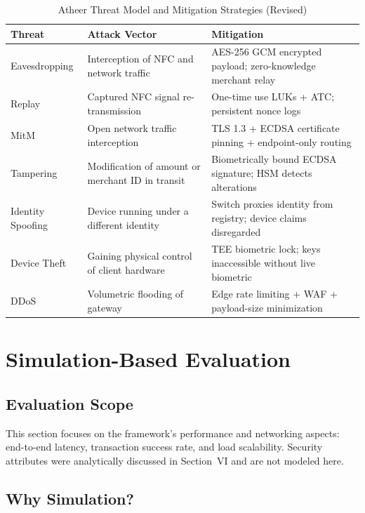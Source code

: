\documentclass[conference,10pt]{IEEEtran}
\begin{document}
\begin{table}[t]
\caption{Atheer Threat Model and Mitigation Strategies (Revised)}
\label{tab:threats}
\centering
\footnotesize
\begin{tabular}{@{}p{1.6cm}p{4.2cm}p{9cm}@{}}
\toprule
\textbf{Threat} & \textbf{Attack Vector} & \textbf{Mitigation} \\
\midrule
Eavesdropping & Interception of NFC and network traffic & AES-256 GCM encrypted payload; zero-knowledge merchant relay \\
Replay & Captured NFC signal re-transmission & One-time use LUKs + ATC; persistent nonce logs \\
MitM & Open network traffic interception & TLS 1.3 + ECDSA certificate pinning + endpoint-only routing \\
Tampering & Modification of amount or merchant ID in transit & Biometrically bound ECDSA signature; HSM detects alterations \\
Identity Spoofing & Device running under a different identity & Switch proxies identity from registry; device claims disregarded \\
Device Theft & Gaining physical control of client hardware & TEE biometric lock; keys inaccessible without live biometric \\
DDoS & Volumetric flooding of gateway & Edge rate limiting + WAF + payload-size minimization \\
\bottomrule
\end{tabular}
\end{table}

\section{Simulation-Based Evaluation}
\label{sec:simulation}

\subsection{Evaluation Scope}

This section focuses on the framework's performance and networking aspects: end-to-end latency, transaction success rate, and load scalability. Security attributes were analytically discussed in Section~VI and are not modeled here.

\subsection{Why Simulation?}
\end{document}
